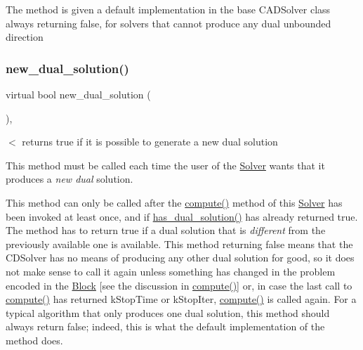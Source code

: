 The method is given a default implementation in the base C\+A\+D\+Solver class always returning false, for solvers that cannot produce any dual unbounded direction \mbox{\label{class_s_m_spp__di__unipi__it_1_1_c_d_a_solver_a8c650415b6673c33692c363abdfdef00}} 
\subsubsection{\texorpdfstring{new\+\_\+dual\+\_\+solution()}{new\_dual\_solution()}}
{\footnotesize\ttfamily virtual bool new\+\_\+dual\+\_\+solution (\begin{DoxyParamCaption}\item[{void}]{ }\end{DoxyParamCaption})\hspace{0.3cm}{\ttfamily [inline]}, {\ttfamily [virtual]}}



$<$ returns true if it is possible to generate a new dual solution 

This method must be called each time the user of the \mbox{\hyperlink{class_s_m_spp__di__unipi__it_1_1_solver}{Solver}} wants that it produces a {\itshape new dual} solution.

This method can only be called after the \mbox{\hyperlink{class_s_m_spp__di__unipi__it_1_1_solver_a504d4e3e174c7a518cc66156a8a45ce5}{compute()}} method of this \mbox{\hyperlink{class_s_m_spp__di__unipi__it_1_1_solver}{Solver}} has been invoked at least once, and if \mbox{\hyperlink{class_s_m_spp__di__unipi__it_1_1_c_d_a_solver_a26970b0da7f4f7b56bcfc890983d9a40}{has\+\_\+dual\+\_\+solution()}} has already returned true. The method has to return true if a dual solution that is {\itshape different} from the previously available one is available. This method returning false means that the C\+D\+Solver has no means of producing any other dual solution for good, so it does not make sense to call it again unless something has changed in the problem encoded in the \mbox{\hyperlink{class_s_m_spp__di__unipi__it_1_1_block}{Block}} \mbox{[}see the discussion in \mbox{\hyperlink{class_s_m_spp__di__unipi__it_1_1_solver_a504d4e3e174c7a518cc66156a8a45ce5}{compute()}}\mbox{]} or, in case the last call to \mbox{\hyperlink{class_s_m_spp__di__unipi__it_1_1_solver_a504d4e3e174c7a518cc66156a8a45ce5}{compute()}} has returned k\+Stop\+Time or k\+Stop\+Iter, \mbox{\hyperlink{class_s_m_spp__di__unipi__it_1_1_solver_a504d4e3e174c7a518cc66156a8a45ce5}{compute()}} is called again. For a typical algorithm that only produces one dual solution, this method should always return false; indeed, this is what the default implementation of the method does.

